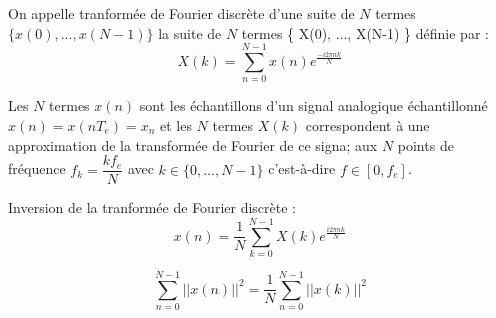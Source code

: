 \documentclass[a4paper,12pt]{article}
\begin{document}
\begin{defi}
    On appelle tranformée de Fourier discrète d'une suite de $N$ termes $\{ x(0), ..., x(N-1) \}$ la suite de $N$ termes \{ X(0), ..., X(N-1) \} définie par :
    \[ X(k) = \sum_{n=0}^{N-1} x(n) e^{\frac{-i2\pi nk}{N}} \]

    Les $N$ termes $x(n)$ sont les échantillons d'un signal analogique échantillonné $x(n) = x(nT_e) = x_n$ et les $N$ termes $X(k)$ correspondent à une approximation de la transformée de Fourier de ce signa; aux $N$ points de fréquence $f_k = \dfrac{kf_e}{N}$ avec $k \in \{ 0, ..., N-1 \}$ c'est-à-dire $f \in [0, f_e]$.

    Inversion de la tranformée de Fourier discrète :
    \[ x(n) = \dfrac{1}{N} \sum_{k=0}^{N-1}X(k) e^{\frac{i2\pi nk}{N}} \]
\end{defi}

\begin{defi}
    \[ \sum_{n=0}^{N-1} ||x(n)||^2 = \dfrac{1}{N} \sum_{n=0}^{N-1} ||x(k)||^2 \]
\end{defi}
\end{document}
